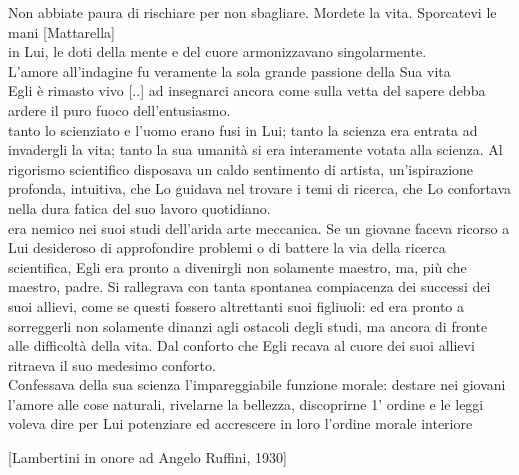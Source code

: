 Non abbiate paura di rischiare per non sbagliare. Mordete la vita. Sporcatevi le mani [Mattarella] \\

in Lui, le doti della mente e del cuore armonizzavano singolarmente.\\

L'amore all'indagine fu veramente la sola grande passione della Sua vita\\

Egli è rimasto vivo [..] ad insegnarci ancora come sulla vetta del sapere debba ardere il puro fuoco dell'entusiasmo. \\

tanto lo scienziato e l'uomo erano fusi in Lui; tanto la scienza era entrata ad invadergli la vita; tanto la sua umanità si era interamente votata alla
scienza. Al rigorismo scientifico disposava un caldo sentimento di artista, un'ispirazione profonda, intuitiva, che Lo guidava nel trovare i temi di ricerca, che Lo confortava nella dura fatica del suo lavoro quotidiano. \\

 era nemico nei suoi studi dell'arida arte meccanica. Se un giovane faceva ricorso a Lui desideroso di approfondire problemi o di battere la via della ricerca scientifica, Egli era pronto a divenirgli non solamente maestro, ma, più che maestro, padre. Si rallegrava con tanta spontanea compiacenza dei successi dei suoi allievi, come se questi fossero altrettanti suoi figliuoli: ed era pronto a
sorreggerli non solamente dinanzi agli ostacoli degli studi, ma ancora di fronte alle difficoltà della vita. Dal conforto che Egli recava al cuore dei suoi allievi ritraeva il suo medesimo conforto.\\

Confessava della sua scienza l'impareggiabile funzione morale: destare nei giovani l'amore alle cose naturali, rivelarne la bellezza, discoprirne 1' ordine e le leggi voleva dire per Lui potenziare ed accrescere in loro l'ordine morale interiore


[Lambertini in onore ad Angelo Ruffini, 1930]

\clearpage